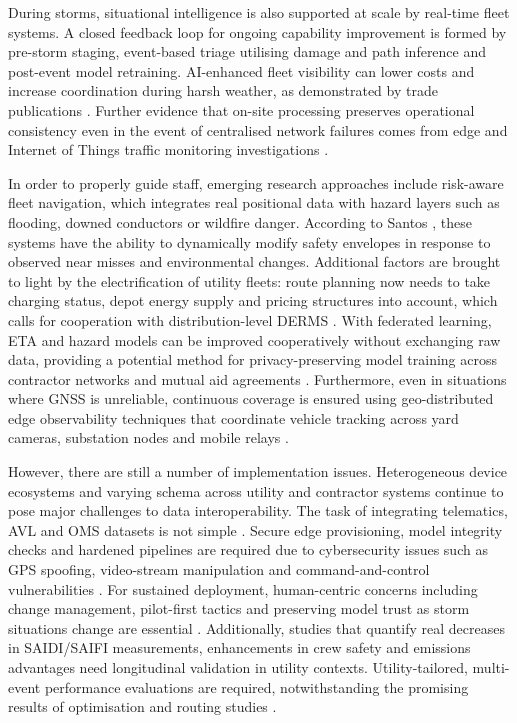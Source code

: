 During storms, situational intelligence is also supported at scale by real-time fleet systems. A closed feedback loop for ongoing capability improvement is formed by pre-storm staging, event-based triage utilising damage and path inference and post-event model retraining. AI-enhanced fleet visibility can lower costs and increase coordination during harsh weather, as demonstrated by trade publications \cite{UtilityDive2025, TDWorld2025}. Further evidence that on-site processing preserves operational consistency even in the event of centralised network failures comes from edge and Internet of Things traffic monitoring investigations \cite{Kheder2024}.

In order to properly guide staff, emerging research approaches include risk-aware fleet navigation, which integrates real positional data with hazard layers such as flooding, downed conductors or wildfire danger. According to Santos \cite{Santos2024}, these systems have the ability to dynamically modify safety envelopes in response to observed near misses and environmental changes. Additional factors are brought to light by the electrification of utility fleets: route planning now needs to take charging status, depot energy supply and pricing structures into account, which calls for cooperation with distribution-level DERMS \cite{EPRI2025}. With federated learning, ETA and hazard models can be improved cooperatively without exchanging raw data, providing a potential method for privacy-preserving model training across contractor networks and mutual aid agreements \cite{Anon2023}. Furthermore, even in situations where GNSS is unreliable, continuous coverage is ensured using geo-distributed edge observability techniques that coordinate vehicle tracking across yard cameras, substation nodes and mobile relays \cite{Dong2024}.

However, there are still a number of implementation issues. Heterogeneous device ecosystems and varying schema across utility and contractor systems continue to pose major challenges to data interoperability. The task of integrating telematics, AVL and OMS datasets is not simple \cite{Oladimeji2023}. Secure edge provisioning, model integrity checks and hardened pipelines are required due to cybersecurity issues such as GPS spoofing, video-stream manipulation and command-and-control vulnerabilities \cite{Ficili2025}. For sustained deployment, human-centric concerns including change management, pilot-first tactics and preserving model trust as storm situations change are essential \cite{EUTC2025}. Additionally, studies that quantify real decreases in SAIDI/SAIFI measurements, enhancements in crew safety and emissions advantages need longitudinal validation in utility contexts. Utility-tailored, multi-event performance evaluations are required, notwithstanding the promising results of optimisation and routing studies \cite{Shuai2023, Sinha2024}.

